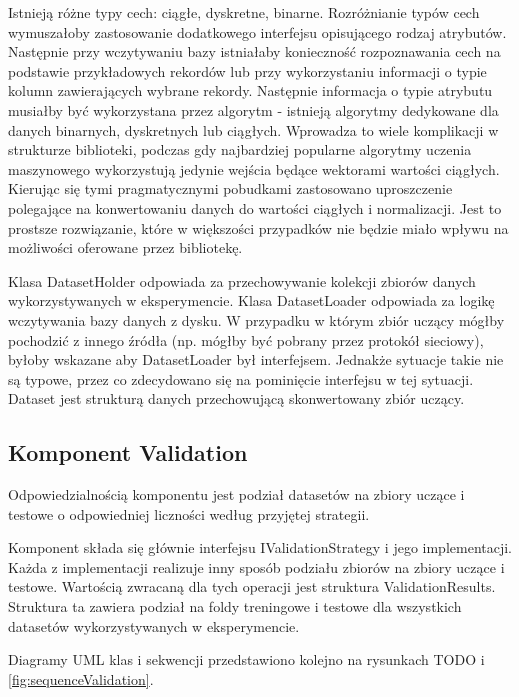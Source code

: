 \documentclass[12pt]{article}
\begin{document}
Istnieją różne typy cech: ciągłe, dyskretne, binarne. Rozróżnianie typów cech wymuszałoby zastosowanie dodatkowego interfejsu opisującego rodzaj atrybutów. Następnie przy wczytywaniu bazy istniałaby konieczność rozpoznawania cech na podstawie przykładowych rekordów lub przy wykorzystaniu informacji o typie kolumn zawierających wybrane rekordy. Następnie informacja o typie atrybutu musiałby być wykorzystana przez algorytm - istnieją algorytmy dedykowane dla danych binarnych, dyskretnych lub ciągłych. Wprowadza to wiele komplikacji w strukturze biblioteki, podczas gdy najbardziej popularne algorytmy uczenia maszynowego wykorzystują jedynie wejścia będące wektorami wartości ciągłych. Kierując się tymi pragmatycznymi pobudkami zastosowano uproszczenie polegające na konwertowaniu danych do wartości ciągłych i normalizacji. Jest to prostsze rozwiązanie, które w większości przypadków nie będzie miało wpływu na możliwości oferowane przez bibliotekę.

Klasa DatasetHolder odpowiada za przechowywanie kolekcji zbiorów danych wykorzystywanych w eksperymencie. Klasa DatasetLoader odpowiada za logikę wczytywania bazy danych z dysku. W przypadku w którym zbiór uczący mógłby pochodzić z innego źródła (np. mógłby być pobrany przez protokół sieciowy), byłoby wskazane aby DatasetLoader był interfejsem. Jednakże sytuacje takie nie są typowe, przez co zdecydowano się na pominięcie interfejsu w tej sytuacji. Dataset jest strukturą danych przechowującą skonwertowany zbiór uczący.

\subsection{Komponent Validation}

Odpowiedzialnością komponentu jest podział datasetów na zbiory uczące i testowe o odpowiedniej liczności według przyjętej strategii.

Komponent składa się głównie interfejsu IValidationStrategy i jego implementacji. Każda z implementacji realizuje inny sposób podziału zbiorów na zbiory uczące i testowe. Wartością zwracaną dla tych operacji jest struktura ValidationResults. Struktura ta zawiera podział na foldy treningowe i testowe dla wszystkich datasetów wykorzystywanych w eksperymencie. 

Diagramy UML klas i sekwencji przedstawiono kolejno na rysunkach TODO i \ref{fig:sequenceValidation}.
\end{document}
